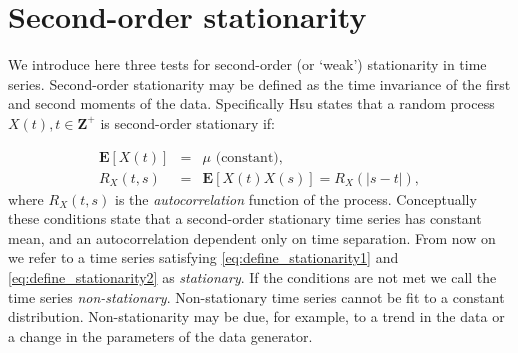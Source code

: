 % 
% 




\section{Second-order stationarity}
\label{sec:stationarity}



We introduce here three tests for second-order (or `weak') stationarity in time series.  Second-order stationarity may be defined as the time invariance of the first and second moments of the data. Specifically Hsu \cite{hsu1997schaum} states that a random process $X(t), t \in \mathbf{Z}^+$ is second-order stationary if:

\begin{eqnarray}
	\mathbf{E}[X(t)] &=& \mu \text{ (constant),}\label{eq:define_stationarity1}\\
	R_X(t,s) &=& \mathbf{E}[X(t)X(s)] = R_X(|s-t|),\label{eq:define_stationarity2}
\end{eqnarray}
%
where $R_X(t,s)$ is the \emph{autocorrelation} function of the process. Conceptually these conditions state that a second-order stationary time series has constant mean, and an autocorrelation dependent only on time separation. From now on we refer to a time series satisfying \ref{eq:define_stationarity1} and \ref{eq:define_stationarity2} as \emph{stationary}. If the conditions are not met we call the time series \emph{non-stationary}. Non-stationary time series cannot be fit to a constant distribution. Non-stationarity may be due, for example, to a trend in the data or a change in the parameters of the data generator.

